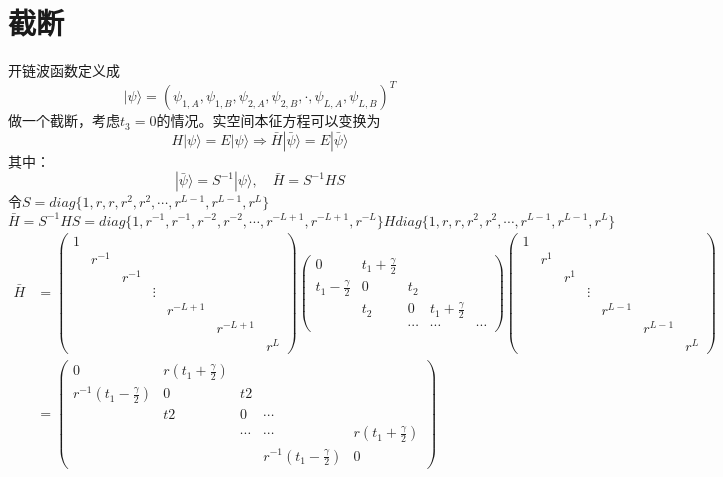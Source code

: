\documentclass{article}
\begin{document}
\section{截断}
开链波函数定义成
\begin{equation}
    |\psi\rangle=(\psi_{1,A},\psi_{1,B},\psi_{2,A},\psi_{2,B},\cdot,\psi_{L,A},\psi_{L,B})^T
\end{equation}
做一个截断，考虑$t_3=0$的情况。实空间本征方程可以变换为
\begin{equation}
    H|\psi\rangle=E|\psi\rangle\Rightarrow \bar{H}|\bar{\psi}\rangle=E|\bar{\psi}\rangle
\end{equation}
其中：
\begin{equation}
    |\bar{\psi}\rangle=S^{-1}|\psi\rangle,\quad \bar{H}=S^{-1}HS
\end{equation}
令$S=diag\{1,r,r,r^2,r^2,\cdots,r^{L-1},r^{L-1},r^L\}$
\begin{equation}
    \bar{H}=S^{-1}HS=diag\{1,r^{-1},r^{-1},r^{-2},r^{-2},\cdots,r^{-L+1},r^{-L+1},r^{-L}\}Hdiag\{1,r,r,r^2,r^2,\cdots,r^{L-1},r^{L-1},r^L\}
\end{equation}
\begin{equation}
    \begin{split}
        \bar{H}&=\begin{pmatrix}
            1\\
            &r^{-1}\\
            &&r^{-1}\\
            &&&\vdots\\
            &&&&r^{-L+1}\\
            &&&&&r^{-L+1}\\
            &&&&&&r^L
        \end{pmatrix}\begin{pmatrix}
            0&t_1+\frac{\gamma}{2}\\
            t_1-\frac{\gamma}{2}&0&t_2\\
            &t_2&0&t_1+\frac{\gamma}{2}\\
            &&\cdots&\cdots&\cdots
        \end{pmatrix}
            \begin{pmatrix}
            1\\
            &r^{1}\\
            &&r^{1}\\
            &&&\vdots\\
            &&&&r^{L-1}\\
            &&&&&r^{L-1}\\
            &&&&&&r^L
        \end{pmatrix}\\
        &=\begin{pmatrix}
            0&r(t_1+\frac{\gamma}{2})\\
            r^{-1}(t_1-\frac{\gamma}{2})&0&t2\\
            &t2&0&\cdots\\
            &&\cdots&\cdots&r(t_1+\frac{\gamma}{2})\\
            &&&r^{-1}(t_1-\frac{\gamma}{2})&0
        \end{pmatrix}
    \end{split}
\end{equation}
\end{document}
